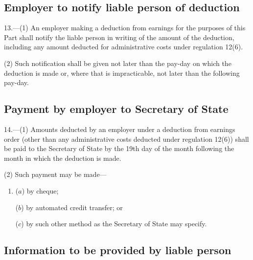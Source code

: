 \documentclass[12pt,a4paper]{article}
\begin{document}

\subsection[13. Employer to notify liable person of deduction]{Employer to notify liable person of deduction}

13.—(1) An employer making a deduction from earnings for the purposes of this Part shall notify the liable person in writing of the amount of the deduction, including any amount deducted for administrative costs under regulation 12(6).

(2) Such notification shall be given not later than the pay-day on which the deduction is made or, where that is impracticable, not later than the following pay-day.

\subsection[14. Payment by employer to Secretary of State]{Payment by employer to Secretary of State}

14.—(1) Amounts deducted by an employer under a deduction from earnings order (other than any administrative costs deducted under regulation 12(6)) shall be paid to the Secretary of State by the 19th day of the month following the month in which the deduction is made.

(2) Such payment may be made—
\begin{enumerate}\item[]
($a$) by cheque;

($b$) by automated credit transfer; or

($c$) by such other method as the Secretary of State may specify.
\end{enumerate}

\subsection[15. Information to be provided by liable person]{Information to be provided by liable person}
\end{document}

